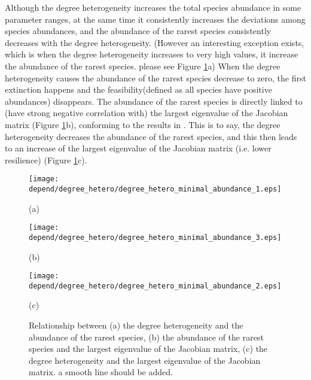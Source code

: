 \documentclass[a4paper,fleqn,12pt]{article}
\begin{document}
Although the degree heterogeneity increases the total species abundance in some parameter ranges,
at the same time it consistently increases the deviations among species abundances,
and the abundance of the rarest species consistently decreases with the degree heterogeneity.
(However an interesting exception exists, which is when the degree heterogeneity increases to very high values, it increase the abundance of the rarest species. please see
Figure \ref{fig:degree-hetero-minimal-abundance}a)
When the degree heterogeneity causes the abundance of the rarest species decrease to zero,
the first extinction happens and the feasibility(defined as all species have positive abundances\cite{saavedra_nested_2016}) disappears.
The abundance of the rarest species is directly linked to (have strong negative correlation with) the largest eigenvalue of the Jacobian matrix (Figure \ref{fig:degree-hetero-minimal-abundance}b), conforming to the results in \cite{suweis_emergence_2013}.
This is to say, the degree heterogeneity decreases the abundance of the rarest species,
and this then leads to an increase of the largest eigenvalue of the Jacobian matrix (i.e. lower resilience) (Figure \ref{fig:degree-hetero-minimal-abundance}c). 

\begin{figure}[htbp]
\begin{minipage}{0.3\linewidth}
  \texttt{[image: depend/degree\_hetero/degree\_hetero\_minimal\_abundance\_1.eps]}
  {\centering(a) \par}
\end{minipage}
\hfill
\begin{minipage}{0.3\linewidth}
  \texttt{[image: depend/degree\_hetero/degree\_hetero\_minimal\_abundance\_3.eps]}
  {\centering(b) \par}
\end{minipage}
\hfill
\begin{minipage}{0.3\linewidth}
  \texttt{[image: depend/degree\_hetero/degree\_hetero\_minimal\_abundance\_2.eps]}
  {\centering(c) \par}
\end{minipage}
\caption{ Relationship between (a) the degree heterogeneity and the abundance of the rarest species, (b) the abundance of the rarest species and the largest eigenvalue of the Jacobian matrix, (c) the degree heterogeneity and the largest eigenvalue of the Jacobian matrix. {\color{red}a smooth line should be added.} }
\label{fig:degree-hetero-minimal-abundance}
\end{figure}
\end{document}
